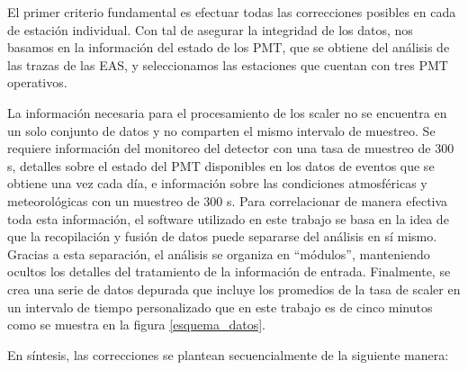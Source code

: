El primer criterio fundamental es efectuar todas las correcciones posibles en cada de estación individual. Con tal de asegurar la integridad de los datos, nos basamos en la información del estado de los PMT, que se obtiene del análisis de las trazas de las EAS, y seleccionamos las estaciones que cuentan con tres PMT operativos. 

La información necesaria para el procesamiento de los scaler no se encuentra en un solo conjunto de datos y no comparten el mismo intervalo de muestreo. Se requiere información del monitoreo del detector con una tasa de muestreo de 300 s, detalles sobre el estado del PMT disponibles en los datos de eventos que se obtiene una vez cada día, e información sobre las condiciones atmosféricas y meteorológicas con un muestreo de 300 s. Para correlacionar de manera efectiva toda esta información, el software utilizado en este trabajo se basa en la idea de que la recopilación y fusión de datos puede separarse del análisis en sí mismo. Gracias a esta separación, el análisis se organiza en “módulos”, manteniendo ocultos los detalles del tratamiento de la información de entrada. Finalmente, se crea una serie de datos depurada que incluye los promedios de la tasa de scaler en un intervalo de tiempo personalizado que en este trabajo es de cinco minutos como se muestra en la figura \ref{esquema_datos}.

En síntesis, las correcciones se plantean secuencialmente de la siguiente manera:

